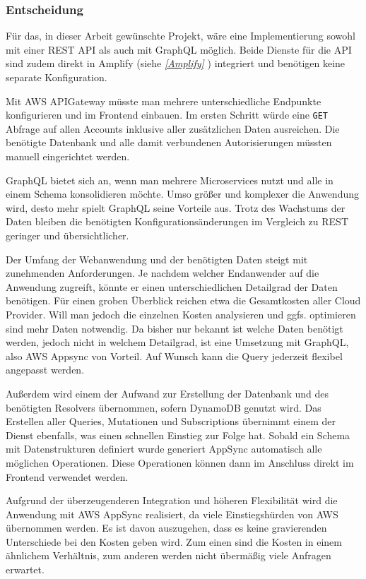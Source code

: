 \clearpage
\subsubsection{Entscheidung}
Für das, in dieser Arbeit gewünschte Projekt, wäre eine Implementierung sowohl mit einer REST API als auch mit GraphQL möglich.
Beide Dienste für die API sind zudem direkt in Amplify (siehe \textit{\ref{Amplify} }) integriert und benötigen keine separate Konfiguration.

Mit AWS APIGateway müsste man mehrere unterschiedliche Endpunkte konfigurieren und im Frontend einbauen.
Im ersten Schritt würde eine \verb+GET+ Abfrage auf allen Accounts inklusive aller zusätzlichen Daten ausreichen.
Die benötigte Datenbank und alle damit verbundenen Autorisierungen müssten manuell eingerichtet werden.

GraphQL bietet sich an, wenn man mehrere Microservices nutzt und alle in einem Schema konsolidieren möchte.
Umso größer und komplexer die Anwendung wird, desto mehr spielt GraphQL seine Vorteile aus.
Trotz des Wachstums der Daten bleiben die benötigten Konfigurationsänderungen im Vergleich zu REST geringer und übersichtlicher.

Der Umfang der Webanwendung und der benötigten Daten steigt mit zunehmenden Anforderungen.
Je nachdem welcher Endanwender auf die Anwendung zugreift, könnte er einen unterschiedlichen Detailgrad der Daten benötigen.
Für einen groben Überblick reichen etwa die Gesamtkosten aller Cloud Provider.
Will man jedoch die einzelnen Kosten analysieren und ggfs. optimieren sind mehr Daten notwendig.
Da bisher nur bekannt ist welche Daten benötigt werden, jedoch nicht in welchem Detailgrad, ist eine Umsetzung mit GraphQL, also AWS Appsync von Vorteil.
Auf Wunsch kann die Query jederzeit flexibel angepasst werden.

Außerdem wird einem der Aufwand zur Erstellung der Datenbank und des benötigten Resolvers übernommen, sofern DynamoDB genutzt wird.
Das Erstellen aller Queries, Mutationen und Subscriptions übernimmt einem der Dienst ebenfalls, was einen schnellen Einstieg zur Folge hat.
Sobald ein Schema mit Datenstrukturen definiert wurde generiert AppSync automatisch alle möglichen Operationen.
Diese Operationen können dann im Anschluss direkt im Frontend verwendet werden.

Aufgrund der überzeugenderen Integration und höheren Flexibilität wird die Anwendung mit AWS AppSync realisiert, da viele Einstiegshürden von AWS übernommen werden.
Es ist davon auszugehen, dass es keine gravierenden Unterschiede bei den Kosten geben wird.
Zum einen sind die Kosten in einem ähnlichem Verhältnis, zum anderen werden nicht übermäßig viele Anfragen erwartet.





